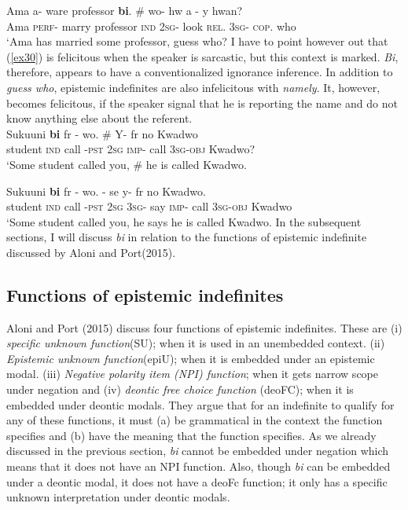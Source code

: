 \documentclass[output=paper,
modfonts
]{langsci/langscibook}
\begin{document}
\ex \label{ex31}
\gll  Ama a- ware professor \textbf{bi}. \# wo- hw a - y hwan?\\
Ama \textsc{perf}- marry professor \textsc{ind} {} \textsc{2sg}- look  \textsc{rel}. \textsc{3sg}- \textsc{cop}. who\\
\glt `Ama has married some professor, guess who?
\z\z I have to point however out that (\ref{ex30}) is felicitous when the speaker is sarcastic, but this context is marked. \emph{Bi}, therefore, appears to have a conventionalized ignorance inference. In addition to \emph{guess who}, epistemic indefinites are also infelicitous with \emph{namely}. It, however, becomes felicitous, if the speaker signal that he is reporting the name and do not know anything else about the referent. 
\ea {}\\
\ea\label{ex32}
 \gll Sukuuni \textbf{bi} fr - wo. \# Y- fr no Kwadwo\\
student \textsc{ind} call -\textsc{pst}  \textsc{2sg} {} \textsc{imp}- call  3\textsc{sg}-\textsc{obj} Kwadwo? \\
    
\glt `Some student called you, \# he is called Kwadwo.

\ex \label{ex33}
\gll  Sukuuni \textbf{bi} fr - wo. - se y- fr no Kwadwo.\\
 student \textsc{ind} call -\textsc{pst}  \textsc{2sg} \textsc{3sg}- say \textsc{imp}- call  \textsc{3sg}-\textsc{obj} Kwadwo\\
\glt `Some student called you, he says he is called Kwadwo.
\z\z In the subsequent sections, I will discuss \emph{bi} in relation to the functions of epistemic indefinite discussed by  Aloni and Port(2015).

\subsection{Functions of epistemic indefinites}
Aloni and Port (2015) discuss four functions of epistemic indefinites. These are (i) \emph{specific unknown function}(SU); when it is used in an unembedded context. (ii) \emph{Epistemic unknown function}(epiU); when it is embedded under an epistemic modal. (iii) \emph{Negative polarity item (NPI) function}; when it gets narrow scope under negation and (iv) \emph{deontic free choice function} (deoFC); when it is embedded under deontic modals. They argue that for an indefinite to qualify for any of these functions, it must (a) be grammatical in the context the function specifies and (b) have the meaning that the function specifies. As we already discussed in the previous section, \emph{bi} cannot be embedded under negation which means that it does not have an NPI function. Also, though \emph{bi} can be embedded under a deontic modal, it does not have a deoFc function; it only has a specific unknown interpretation under deontic modals. 
\end{document}
